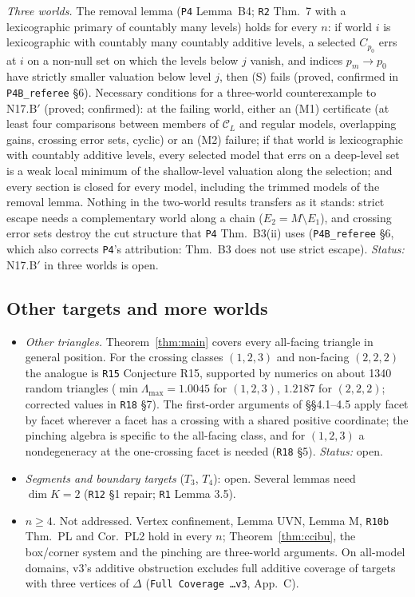 \documentclass[11pt]{article}
\theoremstyle{definition}
\theoremstyle{remark}
\newcommand{\C}{\mathcal C}
\newcommand{\src}[1]{\texttt{#1}}
\begin{document}
\emph{Three worlds.} The removal lemma (\src{P4} Lemma~B4; \src{R2} Thm.~7 with a lexicographic primary of countably many levels) holds for every $n$: if world $i$ is lexicographic with countably many countably additive levels, a selected $C_{p_0}$ errs at $i$ on a non-null set on which the levels below $j$ vanish, and indices $p_m\to p_0$ have strictly smaller valuation below level $j$, then (S) fails (proved, confirmed in \src{P4B\_referee} \S6). Necessary conditions for a three-world counterexample to N17.B$'$ (proved; confirmed): at the failing world, either an (M1) certificate (at least four comparisons between members of $\C_L$ and regular models, overlapping gains, crossing error sets, cyclic) or an (M2) failure; if that world is lexicographic with countably additive levels, every selected model that errs on a deep-level set is a weak local minimum of the shallow-level valuation along the selection; and every section is closed for every model, including the trimmed models of the removal lemma. Nothing in the two-world results transfers as it stands: strict escape needs a complementary world along a chain ($E_2=M\setminus E_1$), and crossing error sets destroy the cut structure that \src{P4} Thm.~B3(ii) uses (\src{P4B\_referee} \S6, which also corrects \src{P4}'s attribution: Thm.~B3 does not use strict escape). \emph{Status:} N17.B$'$ in three worlds is open.

\subsection{Other targets and more worlds}\label{sec:open-other}
\begin{itemize}[leftmargin=*]
\item \emph{Other triangles.} Theorem~\ref{thm:main} covers every all-facing triangle in general position. For the crossing classes $(1,2,3)$ and non-facing $(2,2,2)$ the analogue is \src{R15} Conjecture R15, supported by numerics on about 1340 random triangles ($\min\Lambda_{\max}=1.0045$ for $(1,2,3)$, $1.2187$ for $(2,2,2)$; corrected values in \src{R18} \S7). The first-order arguments of \S\S4.1--4.5 apply facet by facet wherever a facet has a crossing with a shared positive coordinate; the pinching algebra is specific to the all-facing class, and for $(1,2,3)$ a nondegeneracy at the one-crossing facet is needed (\src{R18} \S5). \emph{Status:} open.
\item \emph{Segments and boundary targets} ($T_3$, $T_4$): open. Several lemmas need $\dim K=2$ (\src{R12} \S1 repair; \src{R1} Lemma 3.5).
\item \emph{$n\ge4$.} Not addressed. Vertex confinement, Lemma UVN, Lemma M, \src{R10b} Thm.~PL and Cor.~PL2 hold in every $n$; Theorem~\ref{thm:ccibu}, the box/corner system and the pinching are three-world arguments. On all-model domains, v3's additive obstruction excludes full additive coverage of targets with three vertices of $\Delta$ (\src{Full Coverage \dots v3}, App.~C).
\end{itemize}
\end{document}

